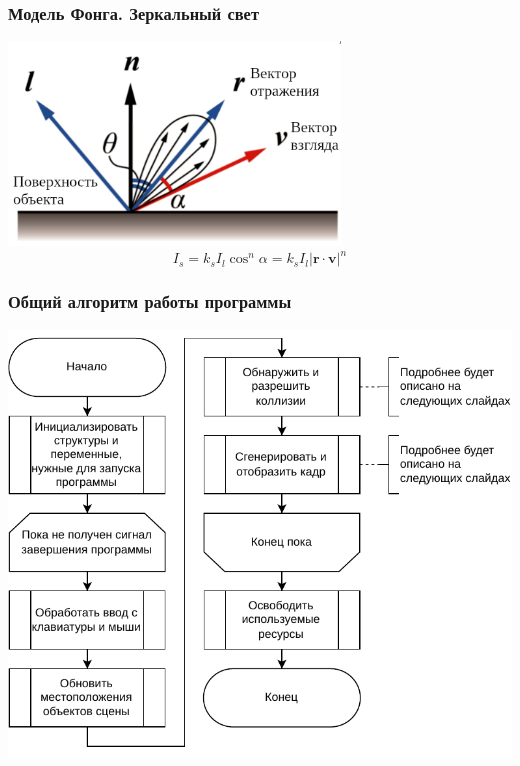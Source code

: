 \documentclass{beamer}
\begin{document}
\begin{frame}
\frametitle{Модель Фонга. Зеркальный свет}
\centering
\includegraphics[width=0.66\textwidth]{img/specular_ru}
\begin{equation}
    I_s = k_s I_l \cos^n \alpha = k_s I_l \left| \boldsymbol{r} \cdot \boldsymbol{v} \right|^n
    \label{eq:specular}
\end{equation}
\end{frame}

\begin{frame}
\frametitle{Общий алгоритм работы программы}
\centering
\includegraphics[scale=0.75]{diag/common-algo-for-pres.pdf}
\end{frame}
\end{document}
